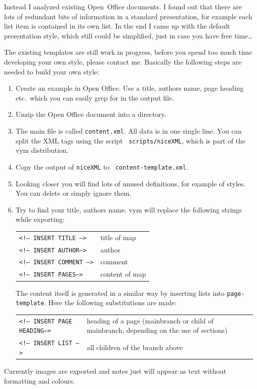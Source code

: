 \documentclass[12pt,a4paper]{article}
\newcommand{\vym}{{\sc vym }}
\begin{document}
\begin{appendix}
Instead I analyzed existing Open~Office documents. I found out that
there are lots of redundant bits of information in a standard
presentation, for example each list item is contained in its own list.
In the end I came up with the default presentation style, which still
could be simplified, just in case you have free time\ldots

The existing templates are still work in progress, before you spend too
much time developing your own style, please contact me.  Basically the
following steps are needed to build your own style:
\begin{enumerate}
    \item Create an example in Open Office. Use a title, authors name,
    page heading etc.\ which you can easily grep for in the output file.
    
    \item Unzip  the Open Office document into a directory.

    \item The main file is called {\tt content.xml}. All data is in one
    single line. You can split the XML tags using the script {\tt
    scripts/niceXML}, which is part of the \vym distribution.

    \item Copy the output of {\tt niceXML} to {\tt
    content-template.xml}.

    \item Looking closer you will find lots of unused definitions, for
    example of styles. You can delete or simply ignore them.

    \item Try to find your title, authors name. \vym will replace the
    following strings while exporting:
    \begin{center}
    \begin{tabular}{lp{4cm}}
        {\tt <!-- INSERT TITLE -->}     & title of map \\
        {\tt <!-- INSERT AUTHOR-->  }   & author \\
        {\tt <!-- INSERT COMMENT -->}   & comment \\
        {\tt <!-- INSERT PAGES-->}      & content of map \\
    \end{tabular}
    \end{center}
    The content itself is generated in a similar way by inserting lists
    into {\tt page-template}. Here the following substitutions are made:
    \begin{center}
    \begin{tabular}{lp{7cm}}
        {\tt <!-- INSERT PAGE HEADING-->}       & heading of a page
        (mainbranch or child of mainbranch, depending on the use of
        sections) \\
        {\tt <!-- INSERT LIST -->   }   & all children of the branch above \\
    \end{tabular}
    \end{center}
\end{enumerate}
Currently images are exported and notes just will appear as text
without formatting and colours.





\end{appendix}
\end{document}
